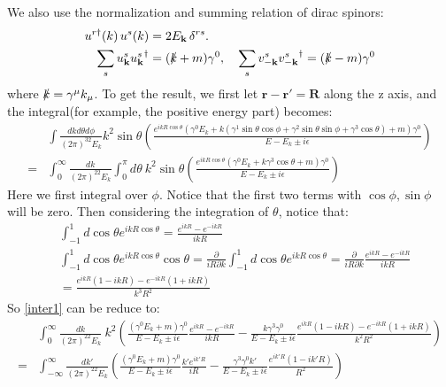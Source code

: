 \documentclass{article}
\numberwithin{equation}{section}
\begin{document}
We also use the normalization and summing relation of dirac spinors\cite{schwartz2013quantum,Peskin:1995ev}:
\begin{align}
    u^{r \dagger}(k) \, u^s(k) &= 2 E_{\mathbf{k}} \, \delta^{rs}.\\
    \sum_s u^s_{\mathbf{k}} {u^s_{\mathbf{k}}}^\dagger &= (\slashed{k} + m)\gamma^0 , \quad
    \sum_s v^s_{-\mathbf{k}} {v^s_{-\mathbf{k}}}^\dagger = (\slashed{k} - m)\gamma^0
\end{align}
where $\slashed{k}=\gamma^\mu k_\mu$. To get the result, we first let $\mathbf{r}-\mathbf{r}'=\mathbf{R}$ along the z axis, and the integral(for example, the positive energy part) becomes:
\begin{align}
    &\int  \frac{dkd\theta d\phi}{(2\pi)^32E_k}k^2\sin\theta\left(\frac{e^{i kR\cos\theta}(\gamma^0 E_k +k \left( \gamma^1 \sin\theta \cos\phi + \gamma^2 \sin\theta \sin\phi + \gamma^3 \cos\theta \right)+ m)\gamma^0}{E - E_k \pm i\epsilon}\right)\nonumber\\
    =&\int_0^\infty  \frac{dk}{(2\pi)^22E_k}\int_{0}^{\pi}d\theta\ k^2\sin\theta\left(\frac{e^{i kR\cos\theta}(\gamma^0 E_k +k  \gamma^3 \cos\theta+ m)\gamma^0}{E - E_k \pm i\epsilon}\right)\label{inter1}
\end{align}
Here we first integral over $\phi$. Notice that the first two terms with $\cos\phi,\sin\phi$ will be zero. Then considering the integration of $\theta$, notice that:
\begin{align}
    &\int_{-1}^{1}d\cos\theta e^{ikR\cos\theta}=\frac{e^{ikR}-e^{-ikR}}{ikR}\\
    &\int_{-1}^{1}d\cos\theta e^{ikR\cos\theta}\cos\theta=\frac{\partial}{iR\partial k}\int_{-1}^{1}d\cos\theta e^{ikR\cos\theta}=\frac{\partial}{iR\partial k}\frac{e^{ikR}-e^{-ikR}}{ikR}\nonumber\\
    &=\frac{e^{i k R} (1-i k R)-e^{-i k R} (1+i k R)}{k^3 R^2}
\end{align}
So \eqref{inter1} can be reduce to:
\begin{align}
    &\int_0^\infty  \frac{dk}{(2\pi)^22E_k}\ k^2\left(\frac{(\gamma^0 E_k + m)\gamma^0}{E - E_k \pm i\epsilon}\frac{e^{ikR}-e^{-ikR}}{ikR}-\frac{k  \gamma^3 \gamma^0}{E - E_k \pm i\epsilon}\frac{e^{i k R} (1-i k R)-e^{-i k R} (1+i k R)}{k^2 R^2}\right)\nonumber\\
    =&\int_{-\infty}^\infty  \frac{dk'}{(2\pi)^22E_k}\left(\frac{(\gamma^0 E_k + m)\gamma^0}{E - E_k \pm i\epsilon}\frac{k'e^{ik'R}}{i R}-\frac{  \gamma^3 \gamma^0 k'}{E - E_k \pm i\epsilon}\frac{e^{i k' R} (1-i k' R)}{R^2}\right)
\end{align}
\end{document}
